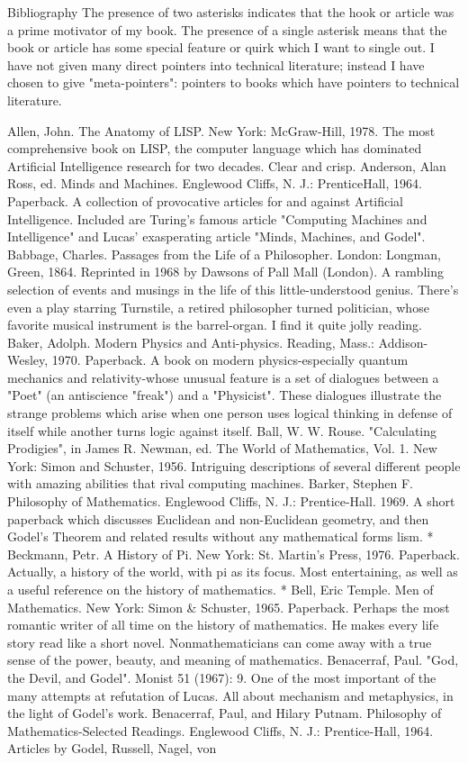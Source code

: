 
                                     Bibliography
  The presence of two asterisks indicates that the hook or article was a prime
  motivator of my book. The presence of a single asterisk means that
  the book or article has some special feature or quirk which I want to single out.
          I have not given many direct pointers into technical literature; instead I have
  chosen to give "meta-pointers": pointers to books which have pointers to technical
  literature.

Allen, John. The Anatomy of LISP. New York: McGraw-Hill, 1978. The most
 comprehensive book on LISP, the computer language which has dominated Artificial
 Intelligence research for two decades. Clear and crisp.
Anderson, Alan Ross, ed. Minds and Machines. Englewood Cliffs, N. J.: PrenticeHall,
 1964. Paperback. A collection of provocative articles for and against Artificial
 Intelligence. Included are Turing's famous article "Computing Machines and
 Intelligence" and Lucas' exasperating article "Minds, Machines, and Godel".
Babbage, Charles. Passages from the Life of a Philosopher. London: Longman, Green,
 1864. Reprinted in 1968 by Dawsons of Pall Mall (London). A rambling selection of
 events and musings in the life of this little-understood genius. There's even a play
 starring Turnstile, a retired philosopher turned politician, whose favorite musical
 instrument is the barrel-organ. I find it quite jolly reading.
Baker, Adolph. Modern Physics and Anti-physics. Reading, Mass.: Addison-Wesley,
 1970. Paperback. A book on modern physics-especially quantum mechanics and
 relativity-whose unusual feature is a set of dialogues between a "Poet" (an antiscience
 "freak") and a "Physicist". These dialogues illustrate the strange problems which arise
 when one person uses logical thinking in defense of itself while another turns logic
 against itself.
Ball, W. W. Rouse. "Calculating Prodigies", in James R. Newman, ed. The World of
 Mathematics, Vol. 1. New York: Simon and Schuster, 1956. Intriguing descriptions of
 several different people with amazing abilities that rival computing machines.
Barker, Stephen F. Philosophy of Mathematics. Englewood Cliffs, N. J.: Prentice-Hall.
 1969. A short paperback which discusses Euclidean and non-Euclidean geometry, and
 then Godel's Theorem and related results without any mathematical forms lism.
* Beckmann, Petr. A History of Pi. New York: St. Martin's Press, 1976. Paperback.
 Actually, a history of the world, with pi as its focus. Most entertaining, as well as a
 useful reference on the history of mathematics.
* Bell, Eric Temple. Men of Mathematics. New York: Simon \& Schuster, 1965.
 Paperback. Perhaps the most romantic writer of all time on the history of mathematics.
 He makes every life story read like a short novel. Nonmathematicians can come away
 with a true sense of the power, beauty, and meaning of mathematics.
Benacerraf, Paul. "God, the Devil, and Godel". Monist 51 (1967): 9. One of the most
 important of the many attempts at refutation of Lucas. All about mechanism and
 metaphysics, in the light of Godel's work.
Benacerraf, Paul, and Hilary Putnam. Philosophy of Mathematics-Selected Readings.
 Englewood Cliffs, N. J.: Prentice-Hall, 1964. Articles by Godel, Russell, Nagel, von

